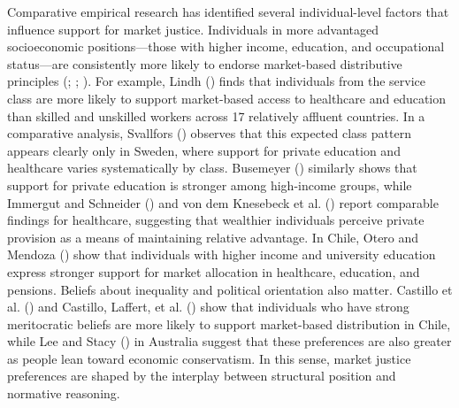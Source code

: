 \documentclass[
  13pt,
]{article}
\begin{document}
Comparative empirical research has identified several individual-level
factors that influence support for market justice. Individuals in more
advantaged socioeconomic positions---those with higher income,
education, and occupational status---are consistently more likely to
endorse market-based distributive principles
(;
;
). For example,
Lindh () finds that individuals
from the service class are more likely to support market-based access to
healthcare and education than skilled and unskilled workers across 17
relatively affluent countries. In a comparative analysis, Svallfors
() observes that this
expected class pattern appears clearly only in Sweden, where support for
private education and healthcare varies systematically by class.
Busemeyer () similarly shows
that support for private education is stronger among high-income groups,
while Immergut and Schneider () and
von dem Knesebeck et al. ()
report comparable findings for healthcare, suggesting that wealthier
individuals perceive private provision as a means of maintaining
relative advantage. In Chile, Otero and Mendoza
() show that individuals with
higher income and university education express stronger support for
market allocation in healthcare, education, and pensions. Beliefs about
inequality and political orientation also matter. Castillo et al.
() and Castillo,
Laffert, et al. () show
that individuals who have strong meritocratic beliefs are more likely to
support market-based distribution in Chile, while Lee and Stacy
() in Australia suggest that these
preferences are also greater as people lean toward economic
conservatism. In this sense, market justice preferences are shaped by
the interplay between structural position and normative reasoning.
\end{document}
